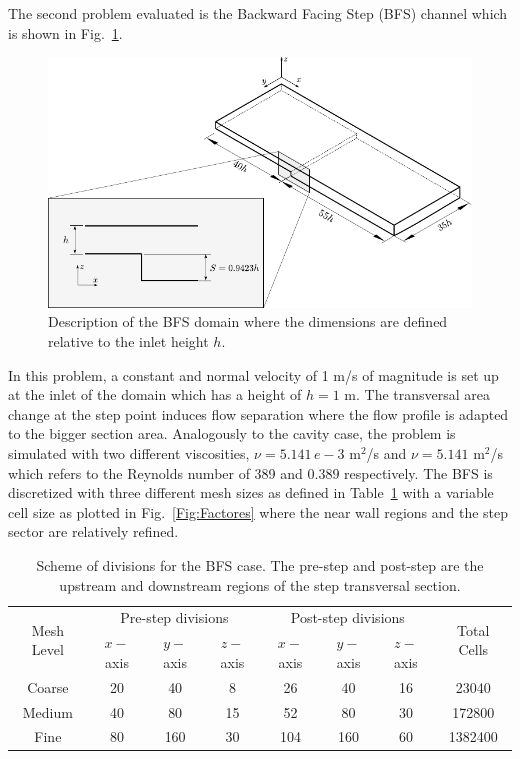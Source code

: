 \documentclass[final,3p,times,10pt,onecolumn]{myElsarticle}
\numberwithin{equation}{section}
\begin{document}
The second problem evaluated is the Backward Facing Step (BFS) channel which is shown in Fig.~\ref{Fig:Geometria3}.
\begin{figure}[b!!!!]
\centering
\includegraphics[width=12cm]{fig/Cases/Geometria3.pdf}
\caption{Description of the BFS domain where the dimensions are defined relative to the inlet height $h$.}
\label{Fig:Geometria3}
\end{figure}
In this problem, a constant and normal velocity of 1 m/s of magnitude is set up at the inlet of the domain which has a height of $h=1$ m. The transversal area change at the step point induces flow separation where the flow profile is adapted to the bigger section area. Analogously to the cavity case, the problem is simulated with two different viscosities, $\nu = 5.141\,e-3$ m$^2$/s and $\nu = 5.141$ m$^2$/s which refers to the Reynolds number of 389 and $0.389$ respectively. The BFS is discretized with three different mesh sizes as defined in Table~\ref{Table:BFSMeshes} with a variable cell size as plotted in Fig.~\ref{Fig:Factores} where the near wall regions and the step sector are relatively refined.
\begin{table}[b!]
\centering
\begin{tabular}{cccccccc}
\hline 
\multirow{2}{1cm}{Mesh Level} & \multicolumn{3}{c}{Pre-step divisions} & \multicolumn{3}{c}{Post-step divisions} & \multirow{2}{1cm}{Total Cells} \\ 
\cline{2-7} 
&  $x-$axis &  $y-$axis &  $z-$axis &  $x-$axis &  $y-$axis &  $z-$axis \\ 
\hline 
Coarse & 20 & 40 & 8 & 26 & 40 & 16 & 23040 \\ 
Medium & 40 & 80 & 15 & 52 & 80 & 30 & 172800 \\ 
Fine & 80 & 160 & 30 & 104 & 160 & 60 & 1382400 \\ 
\hline 
\end{tabular}
\caption{Scheme of divisions for the BFS case. The pre-step and post-step are the upstream and downstream regions of the step transversal section.}
\label{Table:BFSMeshes}
\end{table}
\end{document}
